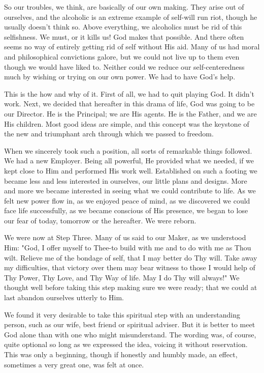 \begin{biblechapter}
So our troubles, we think, are basically of our own making.  They arise out of ourselves, and the alcoholic is an extreme example of self-will run riot, though he usually doesn't think so.  Above everything, we alcoholics must be rid of this selfishness.  We must, or it kills us!  God makes that possible.  And there often seems no way of entirely getting rid of self without His aid.  Many of us had moral and philosophical convictions galore, but we could not live up to them even though we would have liked to.  Neither could we reduce our self-centeredness much by wishing or trying on our own power.  We had to have God's help.

This is the how and why of it.  First of all, we had to quit playing God.  It didn't work.  Next, we decided that hereafter in this drama of life, God was going to be our Director.  He is the Principal; we are His agents.  He is the Father, and we are His children.  Most good ideas are simple, and this concept was the keystone of the new and triumphant arch through which we passed to freedom.

When we sincerely took such a position, all sorts of remarkable things followed.  We had a new Employer.  Being all powerful, He provided what we needed, if we kept close to Him and performed His work well.  Established on such a footing we became less and less interested in ourselves, our little plans and designs.  More and more we became interested in seeing what we could contribute to life.  As we felt new power flow in, as we enjoyed peace of mind, as we discovered we could face life successfully, as we became conscious of His presence, we began to lose our fear of today, tomorrow or the hereafter.  We were reborn.

We were now at Step Three.  Many of us said to our Maker, as we understood Him: "God, I offer myself to Thee-to build with me and to do with me as Thou wilt.  Relieve me of the bondage of self, that I may better do Thy will.  Take away my difficulties, that victory over them may bear witness to those I would help of Thy Power, Thy Love, and Thy Way of life.  May I do Thy will always!"  We thought well before taking this step making sure we were ready; that we could at last abandon ourselves utterly to Him.

We found it very desirable to take this spiritual step with an understanding person, such as our wife, best friend or spiritual adviser.  But it is better to meet God alone than with one who might misunderstand.  The wording was, of course, quite optional so long as we expressed the idea, voicing it without reservation.  This was only a beginning, though if honestly and humbly made, an effect, sometimes a very great one, was felt at once.


\end{biblechapter}
